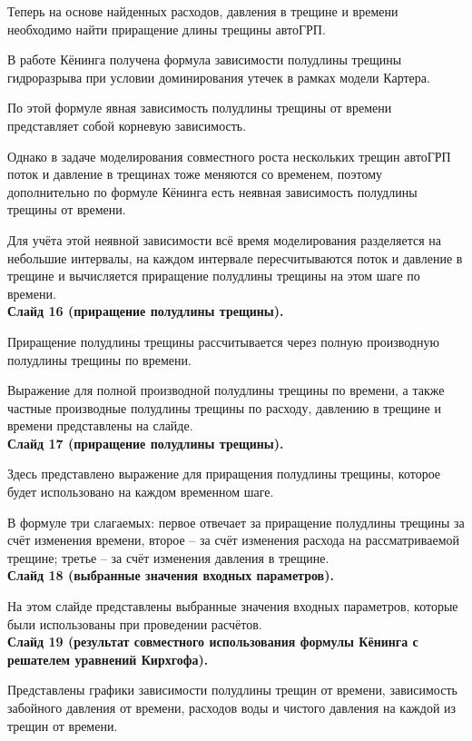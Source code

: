 \documentclass[a4paper, 12pt]{article}
\begin{document}
Теперь на основе найденных расходов, давления в трещине и времени необходимо найти приращение длины трещины автоГРП.

В работе Кёнинга получена формула зависимости полудлины трещины гидроразрыва при условии доминирования утечек в рамках модели Картера.

По этой формуле явная зависимость полудлины трещины от времени представляет собой корневую зависимость.

Однако в задаче моделирования совместного роста нескольких трещин автоГРП поток и давление в трещинах тоже меняются со временем, поэтому дополнительно по формуле Кёнинга есть неявная зависимость полудлины трещины от времени.

Для учёта этой неявной зависимости всё время моделирования разделяется на небольшие интервалы, на каждом интервале пересчитываются поток и давление в трещине и вычисляется приращение полудлины трещины на этом шаге по времени.\\

\textbf{Слайд 16 (приращение полудлины трещины).}

Приращение полудлины трещины рассчитывается через полную производную полудлины трещины по времени.

Выражение для полной производной полудлины трещины по времени, а также частные производные полудлины трещины по расходу, давлению в трещине и времени представлены на слайде.\\

\textbf{Слайд 17 (приращение полудлины трещины).}

Здесь представлено выражение для приращения полудлины трещины, которое будет использовано на каждом временном шаге.

В формуле три слагаемых: первое отвечает за приращение полудлины трещины за счёт изменения времени, второе -- за счёт изменения расхода на рассматриваемой трещине; третье -- за счёт изменения давления в трещине.\\

\textbf{Слайд 18 (выбранные значения входных параметров).}

На этом слайде представлены выбранные значения входных параметров, которые были использованы при проведении расчётов.\\

\textbf{Слайд 19 (результат совместного использования формулы Кёнинга с решателем уравнений Кирхгофа).}

Представлены графики зависимости полудлины трещин от времени, зависимость забойного давления от времени, расходов воды и чистого давления на каждой из трещин от времени. 
\end{document}
